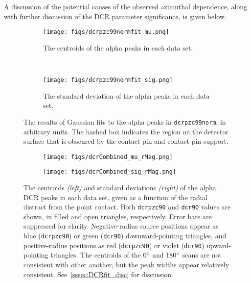 \documentclass[groupedaddress,rmp,amsmath,amssymb,bibnotes,altaffilletter,twocolumn]{revtex4-1}
\begin{document}
A discussion of the potential causes of the observed azimuthal dependence, along with further discussion of the DCR parameter significance, is given below. 

\begin{figure*}[]
 \centering
  \begin{subfigure}[]{.45\textwidth}
 \texttt{[image: figs/dcrpzc99normfit\_mu.png]}
 \caption{The centroids of the alpha peaks in each data set.} 
 \label{fig:dcrNormfit_mu}
\end{subfigure}
~
\begin{subfigure}[]{.45\textwidth}
 \texttt{[image: figs/dcrpzc99normfit\_sig.png]}
 \caption{The standard deviation of the alpha peaks in each data set.} 
 \label{fig:dcrNormfit_sig}
 \end{subfigure}
  \caption{The results of Gaussian fits to the alpha peaks in {\tt dcrpzc99norm}, in arbitrary units. The hashed box indicates the region on the detector surface that is obscured by the contact pin and contact pin support.}
  \label{fig:dcrNormfit}
\end{figure*}

\begin{figure*}[]
 \centering
 \begin{subfigure}[]{.45\textwidth}
 \texttt{[image: figs/dcrCombined\_mu\_rMag.png]}
\end{subfigure}
 \begin{subfigure}[]{.45\textwidth}
 \texttt{[image: figs/dcrCombined\_sig\_rMag.png]}
\end{subfigure}
 \caption{The centroids {\it (left)} and standard deviations {\it (right)} of the alpha DCR peaks in each data set, given as a function of the radial distract from the point contact. Both {\tt dcrpzc90} and {\tt dcr90} values are shown, in filled and open triangles, respectively. Error bars are suppressed for clarity. Negative-radius source positions appear as blue ({\tt dcrpzc90}) or green ({\tt dcr90}) downward-pointing triangles, and positive-radius positions as red ({\tt dcrpzc90}) or violet ({\tt dcr90}) upward-pointing triangles. The centroids of the 0$\degree$ and 180$\degree$ scans are not consistent with other another, but the peak widths appear relatively consistent. See~\ref{sssec:DCRfit_disc} for discussion.} 
 \label{fig:DCRfit_rMag}
\end{figure*}
\end{document}
